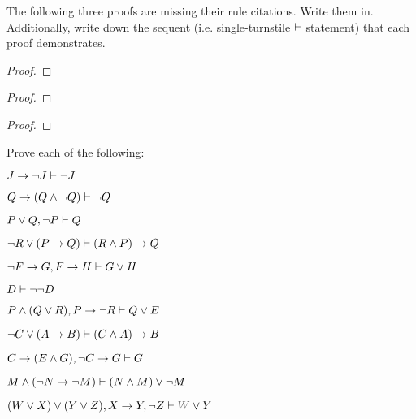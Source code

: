 \practiceproblems
\problempart
The following three proofs are missing their rule citations. Write them in. Additionally, write down the sequent (i.e. single-turnstile $\vdash$ statement) that each proof demonstrates.
\begin{multicols}{2}
\begin{proof}
\end{proof}

\begin{proof}
\open
\close
{}%
\end{proof}

\begin{proof}
\open
\close
\open
\close
{}%
\end{proof}
\end{multicols}

\problempart
Prove each of the following:
\begin{earg}
\item $J\rightarrow\neg J \vdash \neg J$
\item $Q\rightarrow(Q\wedge\neg Q) \vdash \neg Q$
\item $P \vee Q, \neg P \vdash Q$
\item $\neg R \vee (P \rightarrow Q) \vdash (R \wedge P) \rightarrow Q$
\item $\neg F\rightarrow G, F\rightarrow H \vdash G\vee H$
\item $D \vdash \neg \neg D$
\item $P \wedge (Q\vee R), P\rightarrow \neg R \vdash Q\vee E$
\item $\neg C \vee (A \rightarrow B) \vdash (C \wedge A) \rightarrow B$
\item $C\rightarrow(E\wedge G), \neg C \rightarrow G \vdash G$
\item $M \wedge (\neg N \rightarrow \neg M) \vdash (N \wedge M) \vee \neg M$
\item $(W \vee X) \vee (Y \vee Z), X\rightarrow Y, \neg Z \vdash W\vee Y$


\end{earg}




